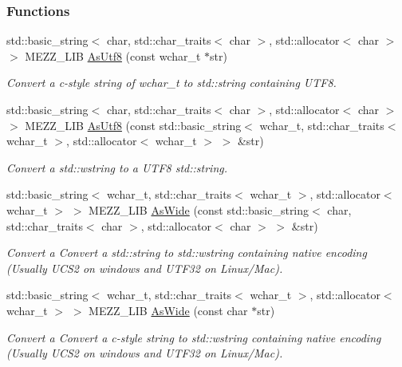 \subsubsection*{Functions}
\begin{DoxyCompactItemize}
\item 
std::basic\_\-string$<$ char, std::char\_\-traits$<$ char $>$, std::allocator$<$ char $>$ $>$ MEZZ\_\-LIB \hyperlink{namespaceMezzanine_1_1xml_a679ef661140ac56d6a5cbb90a5a162ff}{AsUtf8} (const wchar\_\-t $\ast$str)
\begin{DoxyCompactList}\small\item\em Convert a c-\/style string of wchar\_\-t to std::string containing UTF8. \item\end{DoxyCompactList}\item 
std::basic\_\-string$<$ char, std::char\_\-traits$<$ char $>$, std::allocator$<$ char $>$ $>$ MEZZ\_\-LIB \hyperlink{namespaceMezzanine_1_1xml_a9e7d78d778421925a789ecf62d9d1134}{AsUtf8} (const std::basic\_\-string$<$ wchar\_\-t, std::char\_\-traits$<$ wchar\_\-t $>$, std::allocator$<$ wchar\_\-t $>$ $>$ \&str)
\begin{DoxyCompactList}\small\item\em Convert a std::wstring to a UTF8 std::string. \item\end{DoxyCompactList}\item 
std::basic\_\-string$<$ wchar\_\-t, std::char\_\-traits$<$ wchar\_\-t $>$, std::allocator$<$ wchar\_\-t $>$ $>$ MEZZ\_\-LIB \hyperlink{namespaceMezzanine_1_1xml_a809e6b8634f3b484c074e4605961819d}{AsWide} (const std::basic\_\-string$<$ char, std::char\_\-traits$<$ char $>$, std::allocator$<$ char $>$ $>$ \&str)
\begin{DoxyCompactList}\small\item\em Convert a Convert a std::string to std::wstring containing native encoding (Usually UCS2 on windows and UTF32 on Linux/Mac). \item\end{DoxyCompactList}\item 
std::basic\_\-string$<$ wchar\_\-t, std::char\_\-traits$<$ wchar\_\-t $>$, std::allocator$<$ wchar\_\-t $>$ $>$ MEZZ\_\-LIB \hyperlink{namespaceMezzanine_1_1xml_a88f919ddcc4c95f33dff0e44e6427b1c}{AsWide} (const char $\ast$str)
\begin{DoxyCompactList}\small\item\em Convert a Convert a c-\/style string to std::wstring containing native encoding (Usually UCS2 on windows and UTF32 on Linux/Mac). \item\end{DoxyCompactList}\item 

\end{DoxyCompactItemize}
